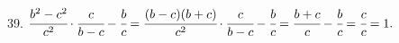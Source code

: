 39. $\cfrac{b^2-c^2}{c^2}\cdot\cfrac{c}{b-c}-\cfrac{b}{c}=\cfrac{(b-c)(b+c)}{c^2}\cdot\cfrac{c}{b-c}-\cfrac{b}{c}=\cfrac{b+c}{c}-\cfrac{b}{c}=\cfrac{c}{c}=1.$\\
